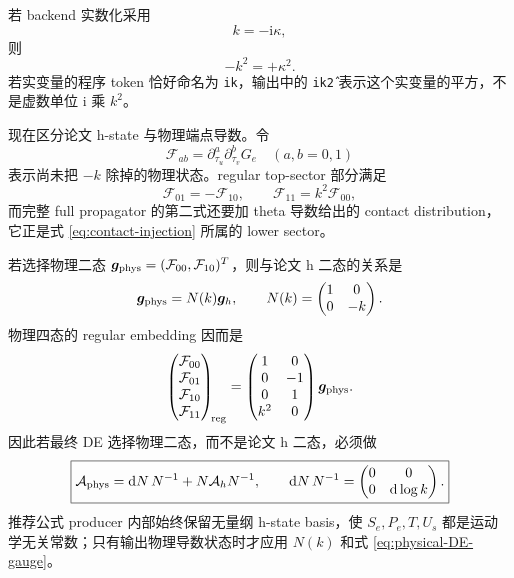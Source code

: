 \documentclass[11pt,a4paper]{ctexart}
\newcommand{\dd}{\mathrm d}
\newcommand{\ii}{\mathrm i}
\begin{document}
若 backend 实数化采用
\begin{equation}
 k=-\ii\kappa,
\end{equation}
则
\begin{equation}
 -k^2=+\kappa^2.
\end{equation}
若实变量的程序 token 恰好命名为 \texttt{ik}，输出中的 \texttt{ik\^2} 表示这个实变量的平方，不是虚数单位 $\ii$ 乘 $k^2$。

现在区分论文 h-state 与物理端点导数。令
\begin{equation}
 \mathcal F_{ab}
 =\partial_{\tau_u}^{a}\partial_{\tau_v}^{b}G_e
 \quad(a,b=0,1)
\end{equation}
表示尚未把 $-k$ 除掉的物理状态。regular top-sector 部分满足
\begin{equation}
 \mathcal F_{01}=-\mathcal F_{10},
 \qquad
 \mathcal F_{11}=k^2\mathcal F_{00},
 \label{eq:physical-massless-relations}
\end{equation}
而完整 full propagator 的第二式还要加 theta 导数给出的 contact distribution，它正是式 \eqref{eq:contact-injection} 所属的 lower sector。

若选择物理二态 $\bm g_{\rm phys}=(\mathcal F_{00},\mathcal F_{10})^T$，则与论文 h 二态的关系是
\begin{equation}
 \bm g_{\rm phys}=N(k)\bm g_h,
 \qquad
 N(k)=\begin{pmatrix}1&0\\0&-k\end{pmatrix}.
 \label{eq:physical-basis-N}
\end{equation}
物理四态的 regular embedding 因而是
\begin{equation}
 \begin{pmatrix}
 \mathcal F_{00}\\\mathcal F_{01}\\\mathcal F_{10}\\\mathcal F_{11}
 \end{pmatrix}_{\!\rm reg}
 =
 \begin{pmatrix}
 1&0\\
 0&-1\\
 0&1\\
 k^2&0
 \end{pmatrix}
 \bm g_{\rm phys}.
 \label{eq:physical-four-to-two}
\end{equation}
因此若最终 DE 选择物理二态，而不是论文 h 二态，必须做
\begin{equation}
 \boxed{
 \mathcal A_{\rm phys}
 =\dd N\,N^{-1}+N\mathcal A_hN^{-1},
 \qquad
 \dd N\,N^{-1}
 =\begin{pmatrix}0&0\\0&\dd\log k\end{pmatrix}.
 }
 \label{eq:physical-DE-gauge}
\end{equation}
推荐公式 producer 内部始终保留无量纲 h-state basis，使 $S_e,P_e,T,U_s$ 都是运动学无关常数；只有输出物理导数状态时才应用 $N(k)$ 和式 \eqref{eq:physical-DE-gauge}。
\end{document}
